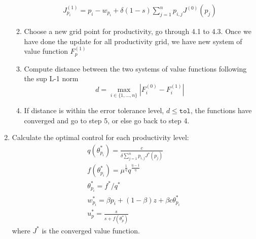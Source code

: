 \documentclass[10pt]{article} %
\begin{document}
\begin{enumerate}
\begin{enumerate}
\begin{gather*}
                    J^{(1)}_{p_i} = p_i - w_{p_i} + \delta (1-s)\sum_{j=1}^{n}p_{i,j}J^{(0)}(p_j)
                \end{gather*}
                \item Choose a new grid point for productivity, go through 4.1 to 4.3. Once we have done the update for all productivity grid, we have new system of value function \({F^{(1)}_p}\)
                \item Compute distance between the two systems of value functions following the sup L-1 norm \[
                    d = \max\limits_{i\in\{1,\ldots,n\}}|F^{(0)}_i-F^{(1)}_i|\]
                \item If distance is within the error tolerance level, \(d \leq \texttt{tol}\), the functions have converged and go to step 5, or else go back to step 4.
            \end{enumerate}
            \item Calculate the optimal control for each productivity level:
            \begin{gather*}
                q(\theta^*_{p_i}) = \frac{c}{\delta \sum_{j=1}^{n}p_{i,j}J^* (p_j)}\\
                f(\theta^*_{p_i}) = \mu^\frac{1}{\eta} q^\frac{\eta-1}{\eta}\\
                \theta^*_{p_i} = f^* / q^*\\
                w^*_{p_i} = \beta p_i + (1-\beta)z + \beta c \theta^*_{p_i}\\
                u^*_p = \frac{s}{s + f(\theta^*_p)}
            \end{gather*}
            where \(J^*\) is the converged value function.
    \end{enumerate}
\end{document}
